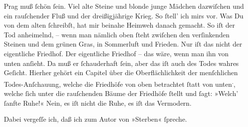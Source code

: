 \pstart
           Prag muß ſchön ſein. Viel alte Steine und blonde
               junge Mädchen dazwiſchen {\pb}und ein rauſchender Fluß und der dreißigjährige
               Krieg. So ſtell’ ich mirs vor. Was Du von dem alten \label{K_L02739-2v}\label{K_L02739-2} ſchreibſt, hat
               mir beinahe Heimweh danach gemacht. So iſt der Tod anheimelnd, – wenn man nämlich
               oben ſteht zwiſchen den verſinkenden Steinen und dem grünen Gras, in Sommerluft und
               Frieden. Nur iſt das nicht der eigentliche Friedhof. Der eigentliche {\pb}Friedhof – das wäre, wenn man ihn von unten anſieht.
               Da muß er ſchauderhaft ſein, aber das  iſt auch des Todes wahres Geſicht. Hierher gehört ein Capitel über die
               Oberflächlichkeit der menſchlichen Todes-Anſchauung, welche die Friedhöfe von oben
               betrachtet ſtatt von unten\substVorne{}\textsuperscript{.}\substDazwischen{},\substHinten{} welche ſich unter die  rauſchenden Bäume der Friedhöfe ſtellt und ſagt: {\pb}»Welch’ ſanfte Ruhe!« Nein, es iſt nicht die Ruhe,
               es iſt das Vermodern. \pend
           
\pstart
           Dabei vergeſſe ich, daß ich zum Autor von »Sterben« ſpreche.\pend
           
